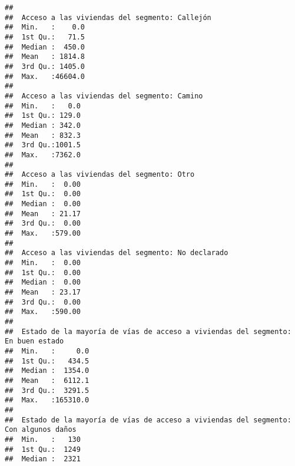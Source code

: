 \documentclass[11pt,]{article}
\begin{document}
\begin{verbatim}
##                                                             
##  Acceso a las viviendas del segmento: Callejón
##  Min.   :    0.0                              
##  1st Qu.:   71.5                              
##  Median :  450.0                              
##  Mean   : 1814.8                              
##  3rd Qu.: 1405.0                              
##  Max.   :46604.0                              
##                                               
##  Acceso a las viviendas del segmento: Camino
##  Min.   :   0.0                             
##  1st Qu.: 129.0                             
##  Median : 342.0                             
##  Mean   : 832.3                             
##  3rd Qu.:1001.5                             
##  Max.   :7362.0                             
##                                             
##  Acceso a las viviendas del segmento: Otro
##  Min.   :  0.00                           
##  1st Qu.:  0.00                           
##  Median :  0.00                           
##  Mean   : 21.17                           
##  3rd Qu.:  0.00                           
##  Max.   :579.00                           
##                                           
##  Acceso a las viviendas del segmento: No declarado
##  Min.   :  0.00                                   
##  1st Qu.:  0.00                                   
##  Median :  0.00                                   
##  Mean   : 23.17                                   
##  3rd Qu.:  0.00                                   
##  Max.   :590.00                                   
##                                                   
##  Estado de la mayoría de vías de acceso a viviendas del segmento: En buen estado
##  Min.   :     0.0                                                               
##  1st Qu.:   434.5                                                               
##  Median :  1354.0                                                               
##  Mean   :  6112.1                                                               
##  3rd Qu.:  3291.5                                                               
##  Max.   :165310.0                                                               
##                                                                                 
##  Estado de la mayoría de vías de acceso a viviendas del segmento: Con algunos daños
##  Min.   :   130                                                                    
##  1st Qu.:  1249                                                                    
##  Median :  2321                                                                    

\end{verbatim}
\end{document}
